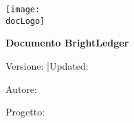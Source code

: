 \begin{titlepage}
  \thispagestyle{empty}
  \centering

  \ifdefined\docLogo
    \vspace*{6mm}
    \texttt{[image: \\docLogo]}\par
    \vspace{16mm}
  \else
    \vspace*{22mm} %
  \fi

  {\sffamily\bfseries\LARGE \ifdefined\BLDTitle \BLDTitle\else Documento BrightLedger\fi \par}
  \vspace{6mm}
  {\sffamily\large
    \ifdefined\BLDVersion Versione: \BLDVersion\fi
    \ifdefined\BLDUpdated \quad|\quad Updated: \BLDUpdated\fi
    \par
  }
  \vspace{2mm}
  {\sffamily
    \ifdefined\BLDAuthor \large Autore: \BLDAuthor\par\fi
    \ifdefined\BLDProject \large Progetto: \BLDProject\par\fi
  }

  \vfill
\end{titlepage}

\tableofcontents
\newpage
